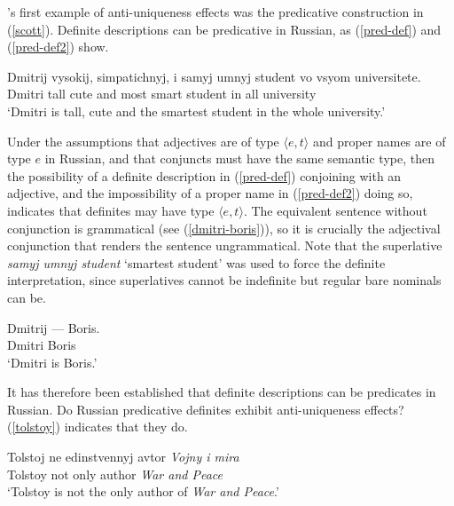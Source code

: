 \documentclass{article}
\begin{document}
\citeauthor{cb2015}'s first example of anti-uniqueness effects was the predicative construction in (\ref{scott}). Definite descriptions can be predicative in Russian, as (\ref{pred-def}) and (\ref{pred-def2}) show.

\begin{exe}
	\ex \label{pred-def} \gll Dmitrij vysokij, simpatichnyj, i samyj umnyj student vo vsyom universitete.\\
	Dmitri tall cute and most smart student in all university\\
	\glt `Dmitri is tall, cute and the smartest student in the whole university.'
\end{exe}

Under the assumptions that adjectives are of type $\langle e, t \rangle$ and proper names are of type $e$ in Russian, and that conjuncts must have the same semantic type, then the possibility of a definite description in (\ref{pred-def}) conjoining with an adjective, and the impossibility of a proper name in (\ref{pred-def2}) doing so, indicates that definites may have type $\langle e, t \rangle$. The equivalent sentence without conjunction is grammatical (see (\ref{dmitri-boris})), so it is crucially the adjectival conjunction that renders the sentence ungrammatical. Note that the superlative \textit{samyj umnyj student} `smartest student' was used to force the definite interpretation, since superlatives cannot be indefinite but regular bare nominals can be.

\begin{exe}
	\ex \label{dmitri-boris} \gll Dmitrij --- Boris.\\
	Dmitri {} Boris\\
	\glt `Dmitri is Boris.'
\end{exe}

It has therefore been established that definite descriptions can be predicates in Russian. Do Russian predicative definites exhibit anti-uniqueness effects? (\ref{tolstoy}) indicates that they do.

\begin{exe}
	\ex \label{tolstoy} \gll Tolstoj ne edinstvennyj avtor \textit{Vojny i mira}\\
	Tolstoy not only author \textit{War and Peace}\\
	\glt `Tolstoy is not the only author of \textit{War and Peace}.'
\end{exe}
\end{document}
